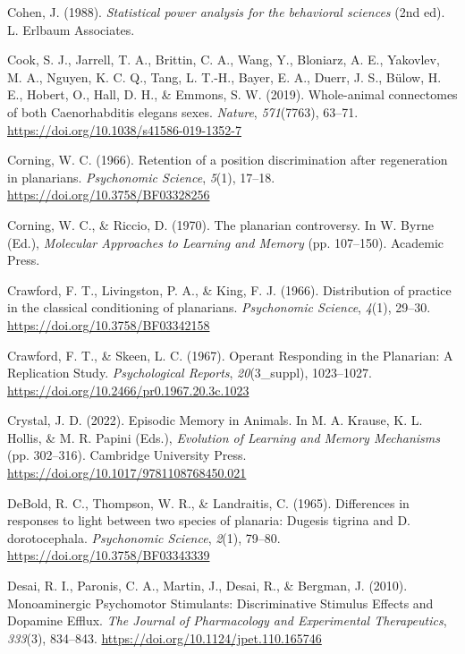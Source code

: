 \documentclass[
  jou,
  floatsintext,
  longtable,
  nolmodern,
  notxfonts,
  notimes,
  donotrepeattitle,
  colorlinks=true,linkcolor=blue,citecolor=blue,urlcolor=blue]{apa7}
\newlength{\cslhangindent}
\newenvironment{CSLReferences}[2] %
 {\begin{list}{}{%
  \setlength{\itemindent}{0pt}
  \setlength{\leftmargin}{0pt}
  \setlength{\parsep}{0pt}
  \ifodd #1
   \setlength{\leftmargin}{\cslhangindent}
   \setlength{\itemindent}{-1\cslhangindent}
  \fi
  \setlength{\itemsep}{#2\baselineskip}}}
 {\end{list}}
\begin{document}
\begin{CSLReferences}{1}{0}
Cohen, J. (1988). \emph{Statistical power analysis for the behavioral
sciences} (2nd ed). L. Erlbaum Associates.

Cook, S. J., Jarrell, T. A., Brittin, C. A., Wang, Y., Bloniarz, A. E.,
Yakovlev, M. A., Nguyen, K. C. Q., Tang, L. T.-H., Bayer, E. A., Duerr,
J. S., Bülow, H. E., Hobert, O., Hall, D. H., \& Emmons, S. W. (2019).
Whole-animal connectomes of both {Caenorhabditis} elegans sexes.
\emph{Nature}, \emph{571}(7763), 63--71.
\url{https://doi.org/10.1038/s41586-019-1352-7}

Corning, W. C. (1966). Retention of a position discrimination after
regeneration in planarians. \emph{Psychonomic Science}, \emph{5}(1),
17--18. \url{https://doi.org/10.3758/BF03328256}

Corning, W. C., \& Riccio, D. (1970). The planarian controversy. In W.
Byrne (Ed.), \emph{Molecular {Approaches} to {Learning} and {Memory}}
(pp. 107--150). Academic Press.

Crawford, F. T., Livingston, P. A., \& King, F. J. (1966). Distribution
of practice in the classical conditioning of planarians.
\emph{Psychonomic Science}, \emph{4}(1), 29--30.
\url{https://doi.org/10.3758/BF03342158}

Crawford, F. T., \& Skeen, L. C. (1967). Operant {Responding} in the
{Planarian}: {A} {Replication} {Study}. \emph{Psychological Reports},
\emph{20}(3\_suppl), 1023--1027.
\url{https://doi.org/10.2466/pr0.1967.20.3c.1023}

Crystal, J. D. (2022). Episodic {Memory} in {Animals}. In M. A. Krause,
K. L. Hollis, \& M. R. Papini (Eds.), \emph{Evolution of {Learning} and
{Memory} {Mechanisms}} (pp. 302--316). Cambridge University Press.
\url{https://doi.org/10.1017/9781108768450.021}

DeBold, R. C., Thompson, W. R., \& Landraitis, C. (1965). Differences in
responses to light between two species of planaria: {Dugesis} tigrina
and {D}. dorotocephala. \emph{Psychonomic Science}, \emph{2}(1), 79--80.
\url{https://doi.org/10.3758/BF03343339}

Desai, R. I., Paronis, C. A., Martin, J., Desai, R., \& Bergman, J.
(2010). Monoaminergic {Psychomotor} {Stimulants}: {Discriminative}
{Stimulus} {Effects} and {Dopamine} {Efflux}. \emph{The Journal of
Pharmacology and Experimental Therapeutics}, \emph{333}(3), 834--843.
\url{https://doi.org/10.1124/jpet.110.165746}


\end{CSLReferences}
\end{document}
